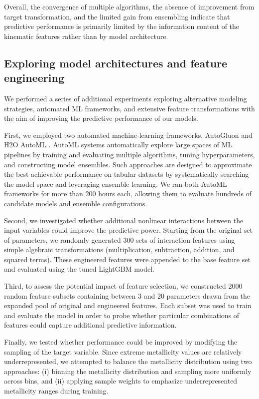 \documentclass{aa}
\begin{document}
Overall, the convergence of multiple algorithms, the absence of improvement from target transformation, and the limited gain from ensembling indicate that predictive performance is primarily limited by the information content of the kinematic features rather than by
model architecture.

\subsection{Exploring model architectures and feature engineering}

We performed a series of additional experiments exploring alternative modeling strategies, automated ML frameworks, and extensive feature transformations with the aim of improving the predictive performance of our models.

First, we employed two automated machine-learning frameworks, AutoGluon \citep{Erickson2020} and H2O AutoML \citep{LeDell2020}. AutoML systems automatically explore large spaces of ML pipelines by training and evaluating multiple algorithms, tuning hyperparameters, and constructing model ensembles. Such approaches are designed to approximate the best achievable performance on tabular datasets by systematically searching the model space and leveraging ensemble learning. We ran both AutoML frameworks for more than 200 hours each, allowing them to evaluate hundreds of candidate models and ensemble configurations.

Second, we investigated whether additional nonlinear interactions between the input variables could improve the predictive power. Starting from the original set of parameters, we randomly generated 300 sets of interaction features using simple algebraic transformations (multiplication, subtraction, addition, and squared terms). These engineered features were appended to the base feature set and evaluated using the tuned LightGBM model.

Third, to assess the potential impact of feature selection, we constructed 2000 random feature subsets containing between 3 and 20 parameters drawn from the expanded pool of original and engineered features. Each subset was used to train and evaluate the model in order to probe whether particular combinations of features could capture additional predictive information.

Finally, we tested whether performance could be improved by modifying the sampling of the target variable. Since extreme metallicity values are relatively underrepresented, we attempted to balance the metallicity distribution using two approaches: (i) binning the metallicity distribution and sampling more uniformly across bins, and (ii) applying sample weights to emphasize underrepresented metallicity ranges during training.
\end{document}
